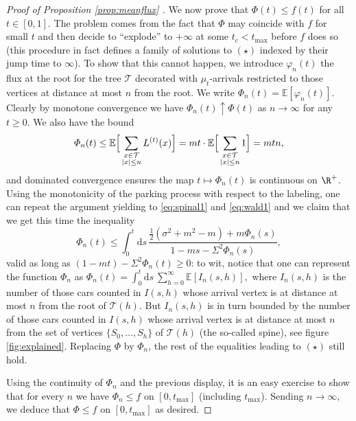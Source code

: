 \begin{proof}[Proof of Proposition \ref{prop:meanflux} ]
We now prove that $\varPhi(t) \leq f(t)$ for all $t \in [0,1]$. The problem comes from the fact that $\varPhi$ may coincide with $f$ for small $t$ and then decide to ``explode'' to $+\infty$ at some $t_c < t_{ \mathrm{max}}$ before $f$ does so (this procedure in fact defines a family of solutions to $(\star)$ indexed by their jump time to $\infty$). To show that this cannot happen, we introduce $\varphi_{n}(t)$ the flux at the root for the tree $\mathcal T$ decorated with $\mu_t$-arrivals restricted to those vertices at distance at most $n$ from the root. We write $ \varPhi_n(t) = \mathbb{E}[\varphi_n(t)]$. Clearly by monotone convergence we have $\varPhi_n(t) \uparrow \varPhi(t)$ as $n \to \infty$ for any $t \geq 0$. We also have the  bound  $$ \varPhi_n(t) \leq  \mathbb{E}\Big[\sum_{ \begin{subarray}{c}	
x \in \mathcal{T}\\ |x|\leq n \end{subarray}} L^{(t)}(x)\Big] = m  t \cdot  \mathbb{E}\Big[\sum_{ \begin{subarray}{c}	
x \in \mathcal{T}\\ |x|\leq n \end{subarray}} 1\Big] =  m t n,$$
and dominated convergence ensures the map $ t  \mapsto \varPhi_n(t)$ is continuous on $\R^+$. Using the monotonicity of the parking process with respect to the labeling, one can repeat the argument yielding to \eqref{eq:spinal1} and \eqref{eq:wald1} and we claim that we get this time the inequality 
%
$$\varPhi_{n}(t) \leq \int_{0}^{t}  \mathrm{d}s\,   \frac{ \frac{1}{2}(\sigma^2+m^2-m)+ m \varPhi_{n}(s)   }{1-ms -\Sigma^2 \varPhi_{n}(s)  }, $$
valid as long as $(1-mt) -\Sigma^2 \varPhi_{n}(t) \geq 0$: 
to wit, notice that one can represent the function $\varPhi_n$ as 
$ \varPhi_n(t)   =      \int_{0}^{t} \mathrm{d}s \ \sum_{h =0}^{\infty}\mathbb{E}[ I_n(s,h)],$
where $I_n(s,h)$ is the number of those cars counted in $I(s,h)$ whose arrival vertex is at distance at most $n$ from the root of $ \mathcal{T}(h)$. But $I_n(s,h)$ is in turn bounded by  the number of those cars  counted in $I(s,h)$ whose arrival vertex is at distance at most $n$ from the set of vertices $\{S_0, \ldots, S_h\}$ of  $\mathcal{T}(h)$ (the so-called spine), see figure \ref{fig:explained}. 
Replacing $\varPhi$ by $\varPhi_n$, the rest of the equalities leading to  $(\star)$  still hold.

Using the continuity of $\varPhi_n$ and the previous display, it is an easy exercise to show that for every $n$ we have $ \varPhi_n \leq f$ on $[0, t_{ \max}]$ (including $t_{\max}$). Sending $n \to \infty$, we deduce that $\varPhi \leq f$ on $[0, t_{ \max}]$ as desired. \end{proof}


